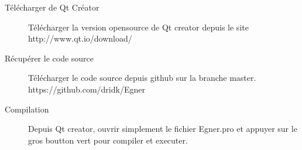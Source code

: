 \documentclass{article}
\begin{document}
\begin{description}
  \item[Télécharger de Qt Créator] Télécharger la version opensource de Qt creator depuis le site http://www.qt.io/download/
  \item[Récupérer le code source] Télécharger le code source depuis github sur la branche master. https://github.com/dridk/Egner 
  \item[Compilation] Depuis Qt creator, ouvrir simplement le fichier Egner.pro et appuyer sur le gros boutton vert pour compiler et executer.
\end{description}


	
\end{document}

